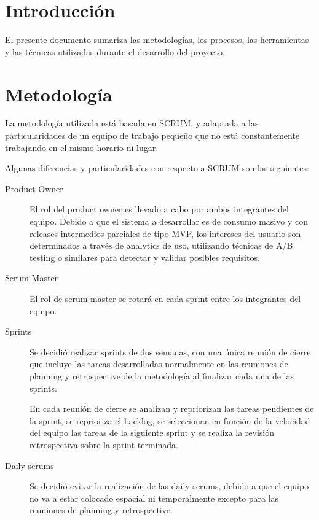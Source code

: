 \documentclass[a4paper,11pt]{article}
\begin{document}

\section{Introducción}
\baselineskip=18pt

El presente documento sumariza las metodologías, los procesos, las herramientas
y las técnicas utilizadas durante el desarrollo del proyecto.

\section{Metodología}

La metodología utilizada está basada en SCRUM, y adaptada a las
particularidades de un equipo de trabajo pequeño que no está constantemente
trabajando en el mismo horario ni lugar.

Algunas diferencias y particularidades con respecto a SCRUM son las siguientes:

\begin{description}

  \item[Product Owner]

    El rol del product owner es llevado a cabo por ambos integrantes del
    equipo. Debido a que el sistema a desarrollar es de consumo masivo y con
    releases intermedios parciales de tipo MVP, los intereses del usuario son
    determinados a través de analytics de uso, utilizando técnicas de A/B
    testing o similares para detectar y validar posibles requisitos.

  \item[Scrum Master]

    El rol de scrum master se rotará en cada sprint entre los integrantes del
    equipo.

  \item[Sprints]

    Se decidió realizar sprints de dos semanas, con una única reunión de cierre
    que incluye las tareas desarrolladas normalmente en las reuniones de
    planning y retrospective de la metodología al finalizar cada una de las
    sprints.

    En cada reunión de cierre se analizan y repriorizan las tareas pendientes
    de la sprint, se reprioriza el backlog, se seleccionan en función de la
    velocidad del equipo las tareas de la siguiente sprint y se realiza la
    revisión retrospectiva sobre la sprint terminada.

  \item[Daily scrums]

    Se decidió evitar la realización de las daily scrums, debido a que el
    equipo no va a estar colocado espacial ni temporalmente excepto para las
    reuniones de planning y retrospective.

\end{description}
\end{document}
